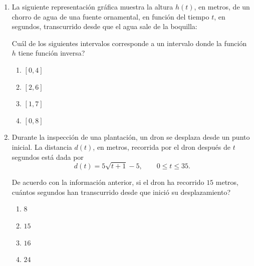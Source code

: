 \documentclass[12pt]{article}
\newcommand{\opcion}[2]{\item $#2$}
\newcommand{\puntotamanoestandar}{0.08cm}
\begin{document}
\begin{enumerate}[label=\textbf{\arabic*.}, start=29, itemsep=1cm]
\Needspace{0.65\textheight}
\item
La siguiente representaci\'on gr\'afica muestra la altura $h(t)$, en metros, de un chorro de agua de una fuente ornamental, en funci\'on del tiempo $t$, en segundos, transcurrido desde que el agua sale de la boquilla:

\begin{center}
\end{center}

\textquestiondown Cu\'al de los siguientes intervalos corresponde a un intervalo donde la funci\'on $h$ tiene funci\'on inversa?

\begin{enumerate}[label=\Alph*)]
  \opcion{A}{[0,4]}
  \opcion{B}{[2,6]}
  \opcion{C}{[1,7]}
  \opcion{D}{[0,8]}
\end{enumerate}

\Needspace{0.34\textheight}
\item
Durante la inspecci\'on de una plantaci\'on, un dron se desplaza desde un punto inicial. La distancia $d(t)$, en metros, recorrida por el dron despu\'es de $t$ segundos est\'a dada por
\[
  d(t)=5\sqrt{t+1}-5, \qquad 0\leq t\leq 35.
\]

De acuerdo con la informaci\'on anterior, si el dron ha recorrido $15$ metros, \textquestiondown cu\'antos segundos han transcurrido desde que inici\'o su desplazamiento?

\begin{enumerate}[label=\Alph*)]
  \opcion{A}{8}
  \opcion{B}{15}
  \opcion{C}{16}
  \opcion{D}{24}
\end{enumerate}


\end{enumerate}
\end{document}
